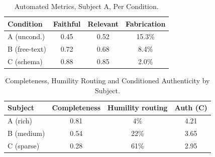 \documentclass[journal]{IEEEtran}
\begin{document}
\begin{table}[htbp]
\caption{Automated Metrics, Subject A, Per Condition.}
\label{tab:automated_metrics}
\centering
\begin{tabular}{lccc}
\toprule
\textbf{Condition} & \textbf{Faithful} & \textbf{Relevant} & \textbf{Fabrication} \\
\midrule
A (uncond.)    & 0.45 & 0.52 & 15.3\% \\
B (free-text)  & 0.72 & 0.68 & 8.4\% \\
C (schema)     & 0.88 & 0.85 & 2.0\% \\
\bottomrule
\end{tabular}
\end{table}


\begin{table}[htbp]
\caption{Completeness, Humility Routing and Conditioned Authenticity by Subject.}
\label{tab:completeness_gradient}
\centering
\begin{tabular}{lccc}
\toprule
\textbf{Subject} & \textbf{Completeness} & \textbf{Humility routing} & \textbf{Auth (C)} \\
\midrule
A (rich)   & 0.81 & 4\%  & 4.21 \\
B (medium) & 0.54 & 22\% & 3.65 \\
C (sparse) & 0.28 & 61\% & 2.95 \\
\bottomrule
\end{tabular}
\end{table}
\end{document}
